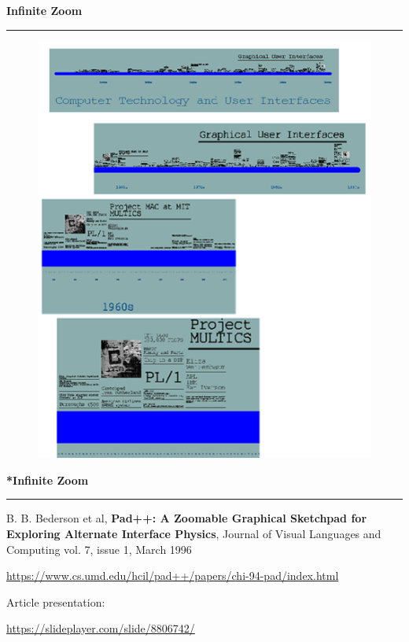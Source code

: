 \documentclass[pdf]{beamer}
\begin{document}
\begin{frame}
{\textbf{Infinite Zoom}}{\textcolor{red}{\rule{12cm}{1.2pt}}}

\begin{figure}
\includegraphics[scale=0.50]{32_picture1.png}
\end{figure}
\end{frame}



\begin{frame}
{\textbf{*Infinite Zoom}}{\textcolor{red}{\rule{12cm}{1.2pt}}}

B. B. Bederson et al, \textbf{Pad++: A Zoomable Graphical Sketchpad for Exploring Alternate Interface Physics}, Journal of Visual Languages and Computing vol. 7, issue 1, March 1996
\newline

\url{https://www.cs.umd.edu/hcil/pad++/papers/chi-94-pad/index.html}	
\newline

Article presentation:

\url{https://slideplayer.com/slide/8806742/}
	
\end{frame}
\end{document}
